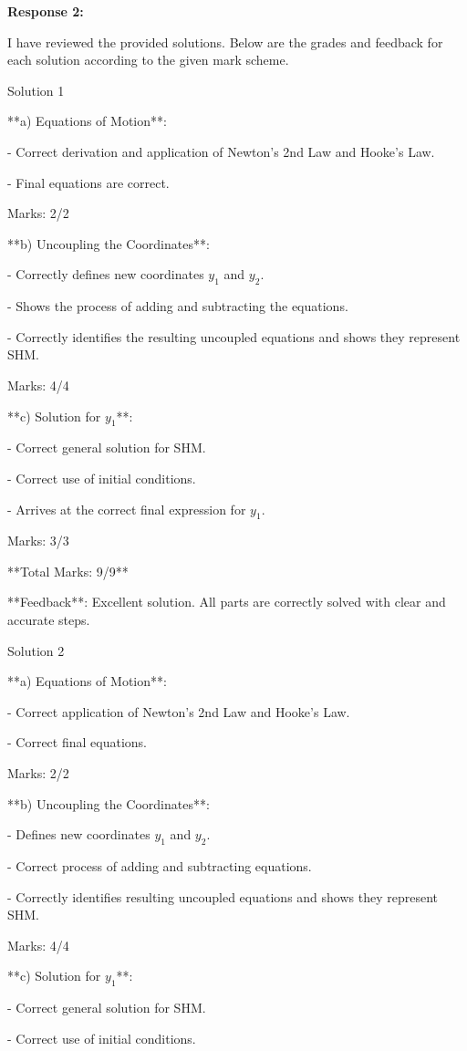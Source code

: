 \documentclass[a4paper,11pt]{article}
\begin{document}
\bigskip
\textbf{Response 2:}

I have reviewed the provided solutions. Below are the grades and feedback for each solution according to the given mark scheme.

Solution 1

**a) Equations of Motion**:

- Correct derivation and application of Newton’s 2nd Law and Hooke’s Law.

- Final equations are correct.

Marks: 2/2

**b) Uncoupling the Coordinates**:

- Correctly defines new coordinates \( y_1 \) and \( y_2 \).

- Shows the process of adding and subtracting the equations.

- Correctly identifies the resulting uncoupled equations and shows they represent SHM.

Marks: 4/4

**c) Solution for \( y_1 \)**:

- Correct general solution for SHM.

- Correct use of initial conditions.

- Arrives at the correct final expression for \( y_1 \).

Marks: 3/3

**Total Marks: 9/9**

**Feedback**: Excellent solution. All parts are correctly solved with clear and accurate steps.

Solution 2

**a) Equations of Motion**:

- Correct application of Newton’s 2nd Law and Hooke’s Law.

- Correct final equations.

Marks: 2/2

**b) Uncoupling the Coordinates**:

- Defines new coordinates \( y_1 \) and \( y_2 \).

- Correct process of adding and subtracting equations.

- Correctly identifies resulting uncoupled equations and shows they represent SHM.

Marks: 4/4

**c) Solution for \( y_1 \)**:

- Correct general solution for SHM.

- Correct use of initial conditions.
\end{document}
